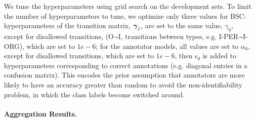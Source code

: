 We tune the hyperparameters using grid search on the development sets. To limit the number of hyperparameters to tune, 
we optimize only three values for BSC:
hyperparameters of the transition matrix, $\boldsymbol\gamma_j$, are set to the same value, 
$\gamma_0$, except for disallowed transitions, (O$\Arrow{0.2cm}$I, transitions between types, e.g. I-PER$\Arrow{0.2cm}$I-ORG), 
which are set to $1e-6$; 
for the annotator models,
all values are set to $\alpha_0$, except for disallowed transitions, which are set to $1e-6$,
then $\epsilon_0$ is added to hyperparameters 
corresponding to correct annotations (e.g. diagonal entries in a confusion matrix).
This encodes the prior assumption that annotators are more likely to have an accuracy greater than random to avoid the non-identifiability problem, in which the class labels become switched around.

\paragraph{Aggregation Results. }\label{sec:task1}

